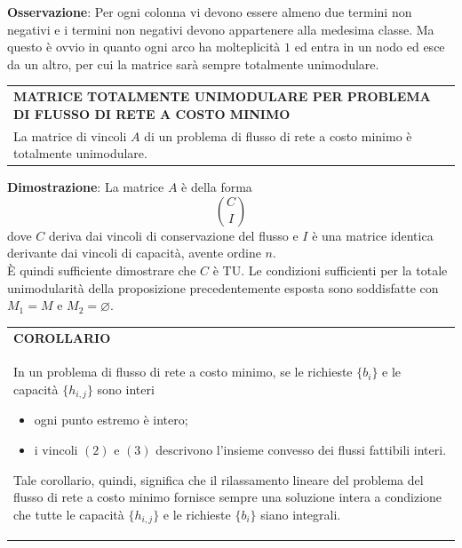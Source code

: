 \documentclass[a4paper]{extarticle}
\renewcommand\arraystretch{}
\begin{document}
\vspace{2em}
\noindent
\textbf{Osservazione}: Per ogni colonna vi devono essere almeno due termini non negativi e i termini non negativi devono appartenere alla medesima classe. Ma questo è ovvio in quanto ogni arco ha molteplicità $1$ ed entra in un nodo ed esce da un altro, per cui la matrice sarà sempre totalmente unimodulare.

\vspace{1em}
\setlength{\tabcolsep}{14pt}
\renewcommand{\arraystretch}{2}
\noindent
\begin{tabularx}{\textwidth}{@{}|P|@{}}
    \hline
    {\textbf{MATRICE TOTALMENTE UNIMODULARE PER PROBLEMA DI FLUSSO DI RETE A COSTO MINIMO}}\\
    \parbox{\linewidth}{La matrice di vincoli $A$ di un problema di flusso di rete a costo minimo è totalmente unimodulare.
    \vspace{3mm}}\\
    \hline
\end{tabularx}

\vspace{2em}
\noindent
\textbf{Dimostrazione}: La matrice $A$ è della forma
\[\binom{C}{I}\]
dove $C$ deriva dai vincoli di conservazione del flusso e $I$ è una matrice identica derivante dai vincoli di capacità, avente ordine $n$.\\
È quindi sufficiente dimostrare che $C$ è TU. Le condizioni sufficienti per la totale unimodularità della proposizione precedentemente esposta sono soddisfatte con $M_1 = M$ e $M_2 = \varnothing$.

\vspace{1em}
\setlength{\tabcolsep}{14pt}
\renewcommand{\arraystretch}{2}
\noindent
\begin{tabularx}{\textwidth}{@{}|P|@{}}
    \hline
    {\textbf{COROLLARIO}}\\
    \parbox{\linewidth}{In un problema di flusso di rete a costo minimo, se le richieste $\{b_i\}$ e le capacità $\{h_{i,j}\}$ sono interi
    \begin{itemize}
        \item ogni punto estremo è intero;
        \item i vincoli $(2)$ e $(3)$ descrivono l'insieme convesso dei flussi fattibili interi.
    \end{itemize}
    Tale corollario, quindi, significa che il rilassamento lineare del problema del flusso di rete a costo minimo fornisce sempre una soluzione intera a condizione che tutte le capacità $\{h_{i,j}\}$ e le richieste $\{b_i\}$ siano integrali.
    \vspace{3mm}}\\
    \hline
\end{tabularx}
\end{document}
